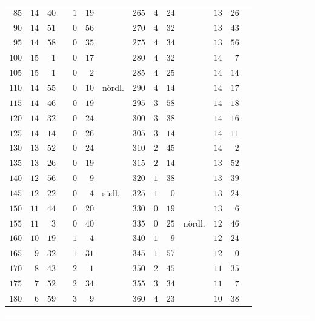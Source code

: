\begin{center}
\begin{tabular}{r|rrl|rrl||r|rrl|rrl}
$85$&$14$&$40$&&$1$&$19$&&$265$&$4$&$24$&&$13$&$26$&\\
$90$&$14$&$51$&&$0$&$56$&&$270$&$4$&$32$&&$13$&$43$&\\[3pt]
$95$&$14$&$58$&&$0$&$35$&&$275$&$4$&$34$&&$13$&$56$&\\
$100$&$15$&$1$&&$0$&$17$&&$280$&$4$&$32$&&$14$&$7$&\\
$105$&$15$&$1$&&$0$&$2$&&$285$&$4$&$25$&&$14$&$14$&\\
$110$&$14$&$55$&&$0$&$10$&nördl.&$290$&$4$&$14$&&$14$&$17$&\\
$115$&$14$&$46$&&$0$&$19$&&$295$&$3$&$58$&&$14$&$18$&\\
$120$&$14$&$32$&&$0$&$24$&&$300$&$3$&$38$&&$14$&$16$&\\[3pt]
$125$&$14$&$14$&&$0$&$26$&&$305$&$3$&$14$&&$14$&$11$&\\
$130$&$13$&$52$&&$0$&$24$&&$310$&$2$&$45$&&$14$&$2$&\\
$135$&$13$&$26$&&$0$&$19$&&$315$&$2$&$14$&&$13$&$52$&\\
$140$&$12$&$56$&&$0$&$9$&&$320$&$1$&$38$&&$13$&$39$&\\
$145$&$12$&$22$&&$0$&$4$&südl.&$325$&$1$&$0$&&$13$&$24$&\\
$150$&$11$&$44$&&$0$&$20$&&$330$&$0$&$19$&&$13$&$6$&\\[3pt]
$155$&$11$&$3$&&$0$&$40$&&$335$&$0$&$25$&nördl.&$12$&$46$&\\
$160$&$10$&$19$&&$1$&$4$&&$340$&$1$&$9$&&$12$&$24$&\\
$165$&$9$&$32$&&$1$&$31$&&$345$&$1$&$57$&&$12$&$0$&\\
$170$&$8$&$43$&&$2$&$1$&&$350$&$2$&$45$&&$11$&$35$&\\
$175$&$7$&$52$&&$2$&$34$&&$355$&$3$&$34$&&$11$&$7$&\\
$180$&$6$&$59$&&$3$&$9$&&$360$&$4$&$23$&&$10$&$38$&\\
\end{tabular}
\endgroup
\end{center}
\begin{center}\rule{.25\linewidth}{.4pt}\end{center}
\clearpage
\thispagestyle{empty}
\noindent{}\null\par
\clearpage
